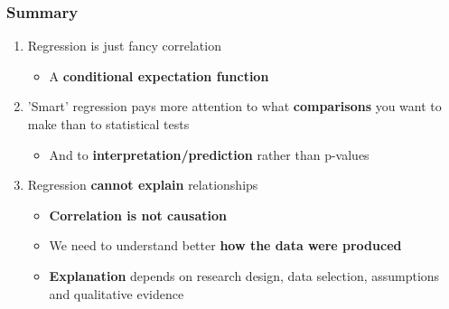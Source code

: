 \documentclass[xcolor=x11names,compress]{beamer}\usepackage[]{graphicx}\usepackage[]{color}
\renewcommand{\(}{\begin{columns}}
\renewcommand{\)}{\end{columns}}
\newcommand{\<}[1]{\begin{column}{#1}}
\renewcommand{\>}{\end{column}}
\begin{document}
\begin{frame}
\frametitle{Summary}
\begin{enumerate}
\item Regression is just fancy correlation
\begin{itemize}
\item A \textbf{conditional expectation function}
\pause
\end{itemize}
\item 'Smart' regression pays more attention to what \textbf{comparisons} you want to make than to statistical tests
\begin{itemize}
\item And to \textbf{interpretation/prediction} rather than p-values
\end{itemize}
\pause
\item Regression \textbf{cannot explain} relationships
\begin{itemize}
\item \textbf{Correlation is not causation}
\pause
\item We need to understand better \textbf{how the data were produced}
\pause
\item \textbf{Explanation} depends on research design, data selection, assumptions and qualitative evidence
\end{itemize}
\end{enumerate}
\end{frame}
\end{document}
